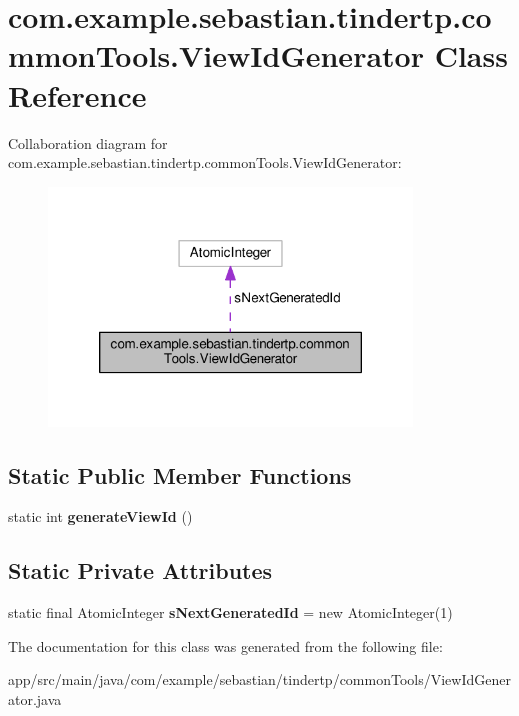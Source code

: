 \hypertarget{classcom_1_1example_1_1sebastian_1_1tindertp_1_1commonTools_1_1ViewIdGenerator}{}\section{com.\+example.\+sebastian.\+tindertp.\+common\+Tools.\+View\+Id\+Generator Class Reference}
\label{classcom_1_1example_1_1sebastian_1_1tindertp_1_1commonTools_1_1ViewIdGenerator}


Collaboration diagram for com.\+example.\+sebastian.\+tindertp.\+common\+Tools.\+View\+Id\+Generator\+:
\nopagebreak
\begin{figure}[H]
\begin{center}
\leavevmode
\includegraphics[width=274pt]{classcom_1_1example_1_1sebastian_1_1tindertp_1_1commonTools_1_1ViewIdGenerator__coll__graph}
\end{center}
\end{figure}
\subsection*{Static Public Member Functions}
\begin{DoxyCompactItemize}
\item 
static int {\bfseries generate\+View\+Id} ()\hypertarget{classcom_1_1example_1_1sebastian_1_1tindertp_1_1commonTools_1_1ViewIdGenerator_aa738b160f35bd54b5c8ac42dbe5a2291}{}\label{classcom_1_1example_1_1sebastian_1_1tindertp_1_1commonTools_1_1ViewIdGenerator_aa738b160f35bd54b5c8ac42dbe5a2291}

\end{DoxyCompactItemize}
\subsection*{Static Private Attributes}
\begin{DoxyCompactItemize}
\item 
static final Atomic\+Integer {\bfseries s\+Next\+Generated\+Id} = new Atomic\+Integer(1)\hypertarget{classcom_1_1example_1_1sebastian_1_1tindertp_1_1commonTools_1_1ViewIdGenerator_ad529b1023647039f3482f679c5a967c6}{}\label{classcom_1_1example_1_1sebastian_1_1tindertp_1_1commonTools_1_1ViewIdGenerator_ad529b1023647039f3482f679c5a967c6}

\end{DoxyCompactItemize}


The documentation for this class was generated from the following file\+:\begin{DoxyCompactItemize}
\item 
app/src/main/java/com/example/sebastian/tindertp/common\+Tools/View\+Id\+Generator.\+java\end{DoxyCompactItemize}
